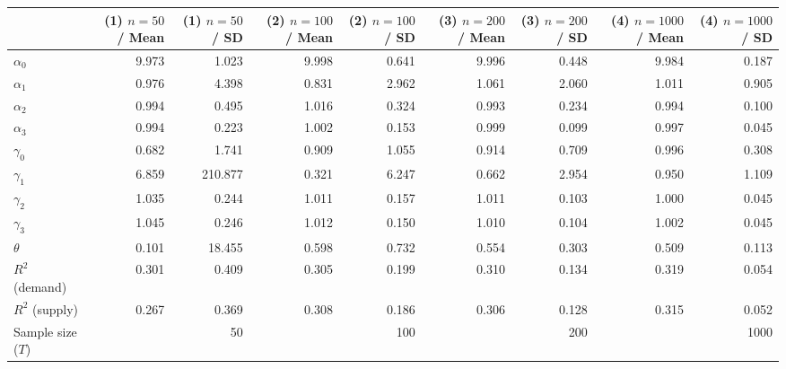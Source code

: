 
\begin{tabular}[t]{lrrrrrrrr}
\toprule
  & (1) $n=50$ / Mean & (1) $n=50$ / SD & (2) $n=100$ / Mean & (2) $n=100$ / SD & (3) $n=200$ / Mean & (3) $n=200$ / SD & (4) $n=1000$ / Mean & (4) $n=1000$ / SD\\
\midrule
$\alpha_{0}$ & 9.973 & 1.023 & 9.998 & 0.641 & 9.996 & 0.448 & 9.984 & 0.187\\
$\alpha_{1}$ & 0.976 & 4.398 & 0.831 & 2.962 & 1.061 & 2.060 & 1.011 & 0.905\\
$\alpha_{2}$ & 0.994 & 0.495 & 1.016 & 0.324 & 0.993 & 0.234 & 0.994 & 0.100\\
$\alpha_{3}$ & 0.994 & 0.223 & 1.002 & 0.153 & 0.999 & 0.099 & 0.997 & 0.045\\
$\gamma_{0}$ & 0.682 & 1.741 & 0.909 & 1.055 & 0.914 & 0.709 & 0.996 & 0.308\\
$\gamma_{1}$ & 6.859 & 210.877 & 0.321 & 6.247 & 0.662 & 2.954 & 0.950 & 1.109\\
$\gamma_{2}$ & 1.035 & 0.244 & 1.011 & 0.157 & 1.011 & 0.103 & 1.000 & 0.045\\
$\gamma_{3}$ & 1.045 & 0.246 & 1.012 & 0.150 & 1.010 & 0.104 & 1.002 & 0.045\\
$\theta$ & 0.101 & 18.455 & 0.598 & 0.732 & 0.554 & 0.303 & 0.509 & 0.113\\
$R^{2}$ (demand) & 0.301 & 0.409 & 0.305 & 0.199 & 0.310 & 0.134 & 0.319 & 0.054\\
$R^{2}$ (supply) & 0.267 & 0.369 & 0.308 & 0.186 & 0.306 & 0.128 & 0.315 & 0.052\\
Sample size ($T$) &  & 50 &  & 100 &  & 200 &  & 1000\\
\bottomrule
\end{tabular}
